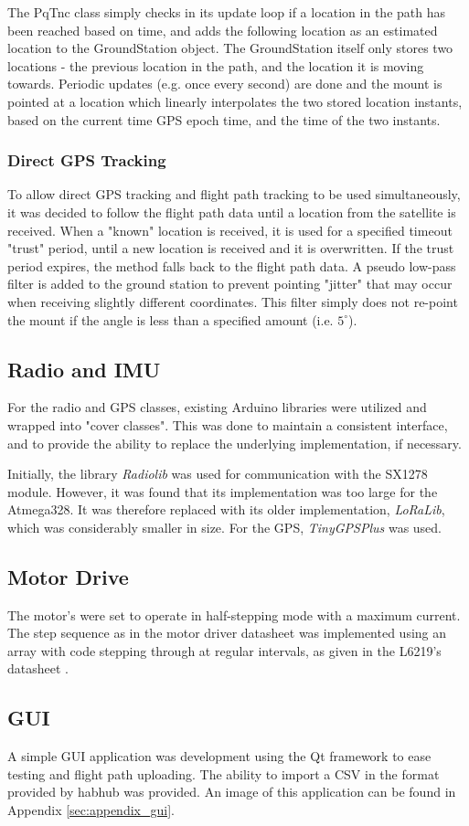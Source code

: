 The PqTnc class simply checks in its update loop if a location in the path has been reached based on time, and adds the following location as an estimated location to the GroundStation object. The GroundStation itself only stores two locations - the previous location in the path, and the location it is moving towards. Periodic updates (e.g. once every second) are done and the mount is pointed at a location which linearly interpolates the two stored location instants, based on the current time GPS epoch time, and the time of the two instants.

\subsubsection{Direct GPS Tracking}
To allow direct GPS tracking and flight path tracking to be used simultaneously, it was decided to follow the flight path data until a location from the satellite is received. When a "known" location is received, it is used for a specified timeout "trust" period, until a new location is received and it is overwritten. If the trust period expires, the method falls back to the flight path data. A pseudo low-pass filter is added to the ground station to prevent pointing "jitter" that may occur when receiving slightly different coordinates. This filter simply does not re-point the mount if the angle is less than a specified amount (i.e. $5^{\circ}$).

\subsection{Radio and IMU}
For the radio and GPS classes, existing Arduino libraries were utilized and wrapped into "cover classes". This was done to maintain a consistent interface, and to provide the ability to replace the underlying implementation, if necessary.

Initially, the library \textit{Radiolib} was used for communication with the SX1278 module. However, it was found that its implementation was too large for the Atmega328. It was therefore replaced with its older implementation, \textit{LoRaLib}, which was considerably smaller in size. For the GPS, \textit{TinyGPSPlus} was used.

\subsection{Motor Drive}
The motor's were set to operate in half-stepping mode with a maximum current. The step sequence as in the motor driver datasheet was implemented using an array with code stepping through at regular intervals, as given in the L6219's datasheet \cite{datasheet-L6219}.

\subsection{GUI}
A simple GUI application was development using the Qt framework to ease testing and flight path uploading. The ability to import a CSV in the format provided by habhub was provided. An image of this application can be found in Appendix \ref{sec:appendix_gui}.